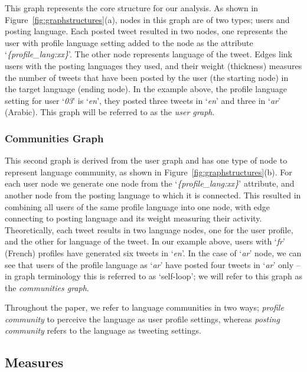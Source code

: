 \documentclass{llncs}
\begin{document}
This graph represents the core structure for our analysis. As shown in
Figure~\ref{fig:graphstructures}(a), nodes in this graph are of two
types; users and posting language. Each posted tweet resulted in two
nodes, one represents the user with profile language setting added to
the node as the attribute `{\emph{\{profile\_lang:xx\}}}'. The other
node represents language of the tweet. Edges link users with the
posting languages they used, and their weight (thickness) measures the
number of tweets that have been posted by the user (the starting node)
in the target language (ending node).  In the example above, the
profile language setting for user `{\emph{03}}' is `{\emph{en}}', they
posted three tweets in `{\emph{en}}' and three in `{\emph{ar}}'
(Arabic). This graph will be referred to as the \emph{user graph}.

\subsubsection{Communities Graph}\label{communitiesgraph}

This second graph is derived from the user graph and has one type of
node to represent language community, as shown in
Figure~\ref{fig:graphstructures}(b).  For each user node we generate
one node from the `{\emph{\{profile\_lang:xx\}}}' attribute, and
another node from the posting language to which it is connected. This
resulted in combining all users of the same profile language into one
node, with edge connecting to posting language and its weight
measuring their activity. Theoretically, each tweet results in two
language nodes, one for the user profile, and the other for language
of the tweet. In our example above, users with `{\emph{fr}}' (French)
profiles have generated six tweets in `{\emph{en}}'. In the case of
`{\emph{ar}}' node, we can see that users of the profile language as
`{\emph{ar}}' have posted four tweets in `{\emph{ar}}' only -- in
graph terminology this is referred to as `self-loop'; we will refer to
this graph as the {\emph{communities graph}}.

Throughout the paper, we refer to language communities in two ways;
{\emph{profile community}} to perceive the language as user profile
settings, whereas {\emph{posting community}} refers to the language as
tweeting settings.

\subsection{Measures}
\end{document}
